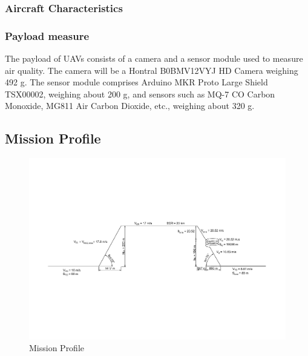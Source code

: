 \documentclass[12 pt]{article}
\begin{document}
\subsubsection{Aircraft Characteristics}
\begin{table}[h]
\centering
{}
\caption{Initial Mission Requirements}
\label{Mission Requirements}
\end{table}

\subsubsection{Payload measure}
The payload of UAVs consists of a camera and a sensor module used to measure air quality. The camera will be a Hontral B0BMV12VYJ HD Camera weighing 492 g. The sensor module comprises Arduino MKR Proto Large Shield TSX00002, weighing about 200 g, and sensors such as MQ-7 CO Carbon Monoxide, MG811 Air Carbon Dioxide, etc., weighing about 320 g.

\subsection{Mission Profile}

\begin{figure}[h]
    \centering
    \includegraphics[width = \linewidth]{Drawing1-Model_final.pdf}
    \caption{Mission Profile}
    \label{Mission Profile}
\end{figure}
\end{document}

